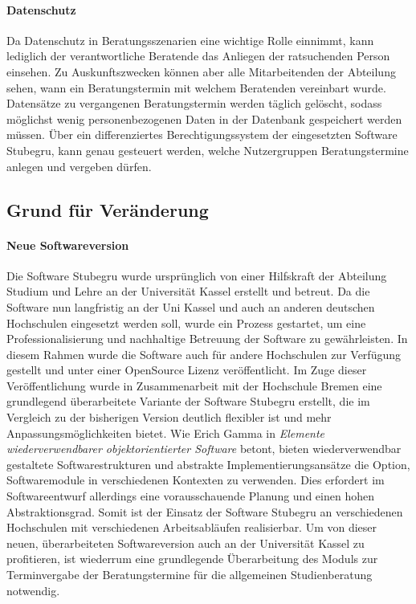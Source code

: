 \documentclass[12pt]{article}
\begin{document}
\paragraph{Datenschutz}
Da Datenschutz in Beratungsszenarien eine wichtige Rolle einnimmt, kann
lediglich der verantwortliche Beratende das Anliegen der ratsuchenden Person
einsehen. Zu Auskunftszwecken können aber alle Mitarbeitenden der Abteilung
sehen, wann ein Beratungstermin mit welchem Beratenden vereinbart wurde.
Datensätze zu vergangenen Beratungstermin werden täglich gelöscht, sodass
möglichst wenig personenbezogenen Daten in der Datenbank gespeichert werden
müssen. Über ein differenziertes Berechtigungssystem der eingesetzten Software
Stubegru, kann genau gesteuert werden, welche Nutzergruppen Beratungstermine
anlegen und vergeben dürfen.

\subsection{Grund für Veränderung}

\paragraph{Neue Softwareversion}
Die Software Stubegru wurde ursprünglich von einer Hilfskraft der Abteilung
Studium und Lehre an der Universität Kassel erstellt und betreut. Da die
Software nun langfristig an der Uni Kassel und auch an anderen deutschen
Hochschulen eingesetzt werden soll, wurde ein Prozess gestartet, um eine
Professionalisierung und nachhaltige Betreuung der Software zu gewährleisten.
In diesem Rahmen wurde die Software auch für andere Hochschulen zur Verfügung
gestellt und unter einer OpenSource Lizenz veröffentlicht. Im Zuge dieser
Veröffentlichung wurde in Zusammenarbeit mit der Hochschule Bremen eine
grundlegend überarbeitete Variante der Software Stubegru erstellt, die im
Vergleich zu der bisherigen Version deutlich flexibler ist und mehr
Anpassungsmöglichkeiten bietet. Wie Erich Gamma in \textit{Elemente
    wiederverwendbarer objektorientierter Software} betont, bieten wiederverwendbar
gestaltete Softwarestrukturen und abstrakte Implementierungsansätze die Option,
Softwaremodule in verschiedenen Kontexten zu verwenden. Dies erfordert im
Softwareentwurf allerdings eine vorausschauende Planung und einen hohen
Abstraktionsgrad.\cite{wiederverwSoftware} Somit ist der Einsatz der Software
Stubegru an verschiedenen Hochschulen mit verschiedenen Arbeitsabläufen
realisierbar. Um von dieser neuen, überarbeiteten Softwareversion auch an der
Universität Kassel zu profitieren, ist wiederrum eine grundlegende
Überarbeitung des Moduls zur Terminvergabe der Beratungstermine für die
allgemeinen Studienberatung notwendig.
\end{document}
